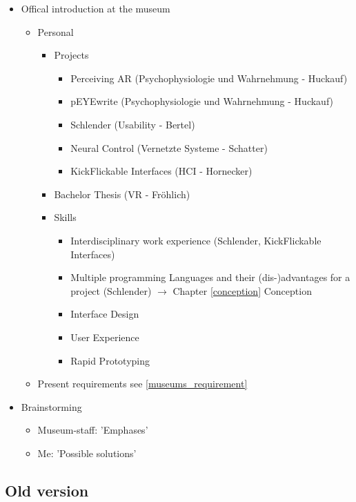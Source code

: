 \begin{itemize}
	\item Offical introduction at the museum
	\begin{itemize}
		\item Personal
		\begin{itemize}
			\item Projects
			\begin{itemize}
				\item Perceiving AR (Psychophysiologie und Wahrnehmung - Huckauf)
				\item pEYEwrite (Psychophysiologie und Wahrnehmung - Huckauf)
				\item Schlender (Usability - Bertel)
				\item Neural Control (Vernetzte Systeme - Schatter)
				\item KickFlickable Interfaces (HCI - Hornecker)
			\end{itemize}
			\item Bachelor Thesis (VR - Fröhlich)
			\item Skills
			\begin{itemize}
				\item Interdisciplinary work experience (Schlender, KickFlickable Interfaces)
				\item Multiple programming Languages and their (dis-)advantages for a project (Schlender) $\to$ Chapter \ref{conception} Conception
				\item Interface Design 
				\item User Experience
				\item Rapid Prototyping
			\end{itemize}
		\end{itemize}
		\item Present requirements see \ref{museums_requirement}
	\end{itemize}
	\item Brainstorming
	\begin{itemize}
		\item Museum-staff: 'Emphases'
		\item Me: 'Possible solutions'
	\end{itemize}
\end{itemize}


\subsection*{Old version}

